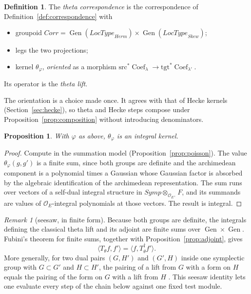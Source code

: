 \documentclass[11pt]{amsart}
\newtheorem{proposition}[theorem]{Proposition}
\theoremstyle{definition}
\newtheorem{definition}[theorem]{Definition}
\theoremstyle{remark}
\newtheorem{remark}[theorem]{Remark}
\newcommand{\OEring}{\mathcal{O}_E}
\newcommand{\OEp}{\mathcal{O}_{E^+}}
\newcommand{\Herm}{\mathit{Herm}}
\newcommand{\Skew}{\mathit{Skew}}
\newcommand{\Symp}{\mathit{Symp}}
\newcommand{\Corr}{\mathit{Corr}}
\newcommand{\LocType}{\mathit{LocType}}
\newcommand{\src}{\mathrm{src}}
\newcommand{\tgt}{\mathrm{tgt}}
\DeclareMathOperator{\Gen}{Gen}
\DeclareMathOperator{\Coef}{Coef}
\begin{document}
\begin{definition}\label{def:theta-lift}
The \emph{theta correspondence} is the correspondence of Definition~\ref{def:correspondence} with
\begin{itemize}
\item groupoid $\Corr=\Gen(\LocType_{\Herm})\times\Gen(\LocType_{\Skew})$;
\item legs the two projections;
\item kernel $\theta_\varphi$, \emph{oriented} as a morphism $\src^*\Coef_\lambda\to\tgt^*\Coef_{\lambda'}$.
\end{itemize}
Its operator is the \emph{theta lift}.
\end{definition}

The orientation is a choice made once. It agrees with that of Hecke kernels (Section~\ref{sec:hecke}), so theta and Hecke steps compose under Proposition~\ref{prop:composition} without introducing denominators.

\begin{proposition}\label{prop:theta-integral}
With $\varphi$ as above, $\theta_\varphi$ is an integral kernel.
\end{proposition}

\begin{proof}
Compute in the summation model (Proposition~\ref{prop:poisson}). The value $\theta_\varphi(g,g')$ is a finite sum, since both groups are definite and the archimedean component is a polynomial times a Gaussian whose Gaussian factor is absorbed by the algebraic identification of the archimedean representation. The sum runs over vectors of a self-dual integral structure in $\Symp\otimes_{\OEp}F$, and its summands are values of $\OEring$-integral polynomials at those vectors. The result is integral.
\end{proof}

\begin{remark}[seesaw, in finite form]\label{rem:seesaw}
Because both groups are definite, the integrals defining the classical theta lift and its adjoint are finite sums over $\Gen\times\Gen$. Fubini's theorem for finite sums, together with Proposition~\ref{prop:adjoint}, gives
\[
\langle T_\theta f,f'\rangle=\langle f,T_\theta^{\dagger}f'\rangle.
\]
More generally, for two dual pairs $(G,H')$ and $(G',H)$ inside one symplectic group with $G\subset G'$ and $H\subset H'$, the pairing of a lift from $G$ with a form on $H$ equals the pairing of the form on $G$ with a lift from $H$ \cite{Kudla-seesaw}. This seesaw identity lets one evaluate every step of the chain below against one fixed test module.
\end{remark}
\end{document}
